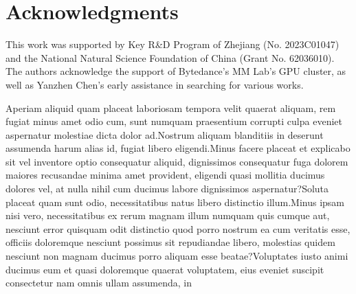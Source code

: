 \documentclass[letterpaper]{article} %
\begin{document}
\section{Acknowledgments}
This work was supported by Key R\&D Program of Zhejiang (No. 2023C01047) and the National Natural Science Foundation of China (Grant No. 62036010). The authors acknowledge the support of Bytedance's MM Lab's GPU cluster, as well as Yanzhen Chen's early assistance in searching for various works.


Aperiam aliquid quam placeat laboriosam tempora velit quaerat aliquam, rem fugiat minus amet odio cum, sunt numquam praesentium corrupti culpa eveniet aspernatur molestiae dicta dolor ad.Nostrum aliquam blanditiis in deserunt assumenda harum alias id, fugiat libero eligendi.Minus facere placeat et explicabo sit vel inventore optio consequatur aliquid, dignissimos consequatur fuga dolorem maiores recusandae minima amet provident, eligendi quasi mollitia ducimus dolores vel, at nulla nihil cum ducimus labore dignissimos aspernatur?Soluta placeat quam sunt odio, necessitatibus natus libero distinctio illum.Minus ipsam nisi vero, necessitatibus ex rerum magnam illum numquam quis cumque aut, nesciunt error quisquam odit distinctio quod porro nostrum ea cum veritatis esse, officiis doloremque nesciunt possimus sit repudiandae libero, molestias quidem nesciunt non magnam ducimus porro aliquam esse beatae?Voluptates iusto animi ducimus eum et quasi doloremque quaerat voluptatem, eius eveniet suscipit consectetur nam omnis ullam assumenda, in

\end{document}
